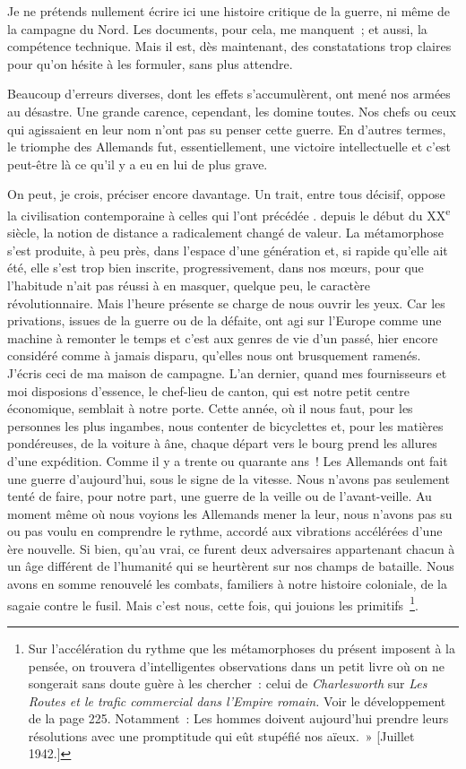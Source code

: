 \documentclass[french,twoside]{book} %
\begin{document}
\noindent Je ne prétends nullement écrire ici une histoire critique de la guerre, ni même de la campagne du Nord. Les documents, pour cela, me manquent ; et aussi, la compétence technique. Mais il est, dès maintenant, des constatations trop claires pour qu’on hésite à les formuler, sans plus attendre.\par
Beaucoup d’erreurs diverses, dont les effets s’accumulèrent, ont mené nos armées au désastre. Une grande carence, cependant, les domine toutes. Nos chefs ou ceux qui agissaient en leur nom n’ont pas su penser cette guerre. En d’autres termes, le   triomphe des Allemands fut, essentiellement, une victoire intellectuelle et c’est peut-être là ce qu’il y a eu en lui de plus grave.\par
On peut, je crois, préciser encore davantage. Un trait, entre tous décisif, oppose la civilisation contemporaine à celles qui l’ont précédée . depuis le début du XX\textsuperscript{e} siècle, la notion de distance a radicalement changé de valeur. La métamorphose s’est produite, à peu près, dans l’espace d’une génération et, si rapide qu’elle ait été, elle s’est trop bien inscrite, progressivement, dans nos mœurs, pour que l’habitude n’ait pas réussi à en masquer, quelque peu, le caractère révolutionnaire. Mais l’heure présente se charge de nous ouvrir les yeux. Car les privations, issues de la guerre ou de la défaite, ont agi sur l’Europe comme une machine à remonter le temps et c’est aux genres de vie d’un passé, hier encore considéré comme à jamais disparu, qu’elles nous ont brusquement ramenés. J’écris ceci de ma maison de campagne. L’an dernier, quand mes fournisseurs et moi disposions d’essence, le chef-lieu de canton, qui est notre petit centre économique, semblait à notre porte. Cette année, où il nous faut, pour les personnes les plus ingambes, nous contenter de bicyclettes et, pour les matières pondéreuses, de la voiture à âne, chaque départ vers le bourg prend les allures d’une expédition. Comme il y a trente ou quarante ans ! Les Allemands ont fait une guerre d’aujourd’hui, sous le signe de la vitesse. Nous n’avons pas seulement tenté de faire, pour notre part, une guerre de la veille ou de l’avant-veille. Au moment même où nous voyions les Allemands mener la leur, nous n’avons pas su ou pas voulu en comprendre le rythme, accordé aux vibrations accélérées d’une ère nouvelle. Si bien, qu’au vrai, ce furent deux adversaires appartenant chacun à un âge différent de l’humanité qui se heurtèrent sur nos champs de bataille. Nous avons en somme renouvelé les combats, familiers à notre histoire coloniale, de la   sagaie contre le fusil. Mais c’est nous, cette fois, qui jouions les primitifs \footnote{ Sur l’accélération du rythme que les métamorphoses du présent imposent à la pensée, on trouvera d’intelligentes observations dans un petit livre où on ne songerait sans doute guère à les chercher : celui de {\itshape Charlesworth} sur {\itshape Les Routes et le trafic commercial dans l’Empire romain.} Voir le développement de la page 225. Notamment : Les hommes doivent aujourd’hui prendre leurs résolutions avec une promptitude qui eût stupéfié nos aïeux. » [Juillet 1942.]}.\par
\end{document}
